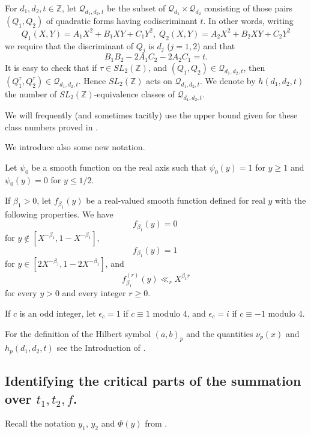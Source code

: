 \documentclass[12pt]{amsart}
\theoremstyle{definition}
\numberwithin{equation}{section}
\begin{document}
For $d_1,d_2,t\in {\mathbb Z}$, let ${\mathcal Q}_{d_1,d_2,t}$ be the subset of $\mathcal{Q}_{d_1}\times\mathcal{Q}_{d_2}$ consisting of those pairs $\left
(Q_1,Q_2\right)$ of quadratic forms having codiscriminant $t$. In other words, writing
$$Q_1\left(X,Y\right)=A_1X^2+B_1XY+C_1Y^2,\;Q_2\left(X,Y\right)=A_
2X^2+B_2XY+C_2Y^2$$
we require that the discriminant of $Q_j$ is $d_j$ ($j=1,2$) and that
$$B_1B_2-2A_1C_2-2A_2C_1=t.$$
It is easy to check that if $\tau\in SL_2({\mathbb Z})$, and
$\left(Q_1,Q_2\right)\in {\mathcal Q}_{d_1,d_2,t}$, then $\left(Q_1^{\tau},Q_
2^{\tau}\right)\in {\mathcal Q}_{d_1,d_2,t}$. Hence $SL_2({\mathbb Z})$
acts on $\mathcal Q_{d_1,d_2,t}$. We denote by $h\left(d_1,d_2,t\right
)$ the number of $SL_2(\mathbb Z)$-equivalence classes of $\mathcal
Q_{d_1,d_2,t}$.

We will frequently (and sometimes tacitly) use the
upper bound given for these class numbers proved in
\cite[Lemma 3.1]{Biro}.

We introduce also some new notation.

Let $\psi_0$ be a smooth function on the real axis
such that $\psi_0\left(y\right)=1$ for $y\ge 1$ and $\psi_0\left(
y\right)=0$ for $y\le 1/2$.

If $\beta_1>0$, let $f_{\beta_1}\left(y\right)$ be a real-valued smooth function defined for real $
y$ with the following properties. We have
\[f_{\beta_1}\left(y\right)=0\:\]
for $y\notin\left[X^{-\beta_1},1-X^{-\beta_1}\right]$,
\[f_{\beta_1}\left(y\right)=1\:\]
for $y\in\left[2X^{-\beta_1},1-2X^{-\beta_1}\right]$, and
\[f_{\beta_1}^{\left(r\right)}\left(y\right)\ll_rX^{\beta_1r}\]
for every $y>0$ and every integer $r\ge 0$.

If $c$ is an odd integer, let $\epsilon_c=1$ if $c\equiv 1$ modulo $
4$, and $\epsilon_c=i$ if $c\equiv -1$ modulo $4$.



For the definition of the Hilbert symbol $\left(a,b\right)_p$ and the
quantities $\nu_p\left(x\right)$ and $h_p\left(d_1,d_2,t\right)$ see the Introduction of \cite{biroClass}.




\subsection{Identifying the critical parts of the summation over $
t_1,t_2,f$.}


Recall the notation $y_1$, $y_2$ and $\Phi(y)$ from \cite[Lemma 4.3]{Biro}.
\end{document}
